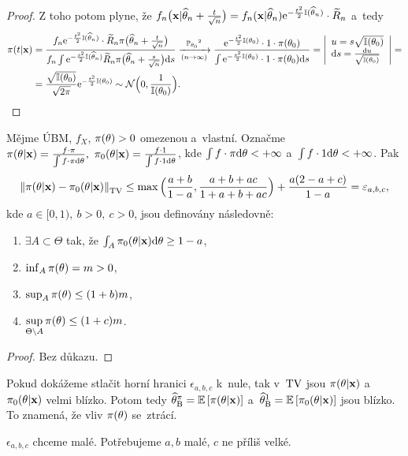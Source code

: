 \begin{dusl}
\begin{proof}
		Z toho potom plyne, že $f_n\big(\textbf{x}|\widehat{\theta}_n+\frac{t}{\sqrt{n}}\big)=f_n(\textbf{x}|\widehat{\theta}_n)\mathrm{e}^{-\frac{t^2}{2}\mathbb{I}(\widehat{\theta}_n)}\cdot\widetilde{R}_n$ a~tedy \[
		\begin{split}
		\pi(t|\textbf{x})&=\frac{f_n\e{-\frac{t^2}{2}\mathbb{I}(\htn)}\cdot\widetilde{R}_n \pi\big( \htn+\frac{t}{\sqrt{n}} \big)}{f_n\int \e{-\frac{s^2}{2}\mathbb{I}(\htn)}\widetilde{R}_n \pi\big(\htn+\frac{s}{\sqrt{n}}\big)\d s}\xrightarrow[(n\rightarrow \infty)]{\PP_{\t_0}\text{\footnotemark}}\frac{\e{-\frac{t^2}{2}\mathbb{I}(\t_0)}\cdot1\cdot \pi(\t_0)}{\int\e{-\frac{s^2}{2}\mathbb{I}(\t_0)}\cdot1\cdot\pi(\t_0)\d s}=\left| \begin{array}{l}
		u=s\sqrt{\mathbb{I}(\t_0)}\\\d s=\frac{\d u}{\sqrt{\mathbb{I}(\t_0)}}		
		\end{array}
		\right|=\\&=\frac{\sqrt{\mathbb{I}(\t_0)}}{\sqrt{2\pi}}\e{-\frac{t^2}{2}\mathbb{I}(\t_0)}\sim\NN\Big( 0,\frac{1}{\mathbb{I}(\t_0)} \Big).
		\end{split}
		\]
	\end{proof}
\end{dusl}
\begin{theorem}
	Mějme ÚBM, $f_X$, $\pi(\theta)>0$ omezenou a~vlastní. Označme $\pi(\theta|\textbf{x})=\frac{f\cdot\pi}{\int f\cdot\pi\mathrm{d}\theta},~\pi_0(\theta|\textbf{x})=\frac{f\cdot1}{\int f\cdot1 \mathrm{d}\theta}$, kde $\int f\cdot\pi\mathrm{d}\theta<+\infty$ a~$\int f\cdot1 \mathrm{d}\theta<+\infty$. Pak
	$$ \left\|\pi(\theta|\textbf{x})-\pi_0(\theta|\textbf{x})\right\|_{\mathrm{TV}}\leq \max\Big(\frac{a+b}{1-a},\frac{a+b+ac}{1+a+b+ac}\Big)+\frac{a(2-a+c)}{1-a}=\varepsilon_{a,b,c},$$
	kde $a\in[ 0,1),~b>0,~c>0$, jsou definovány následovně:\begin{enumerate}[1)]
		\item $\exists A\subset \Theta$ tak, že $\int_A \pi_0(\theta|\textbf{x})\mathrm{d}\theta\geq 1-a$,
		\item $\inf_A \pi(\theta)=m>0$,
		\item $\sup_A \pi(\theta)\leq (1+b)m$,
		\item $\sup\limits_{\Theta\setminus A} \pi(\theta)\leq(1+c)m$. 
	\end{enumerate}
\end{theorem}
\begin{proof}
	Bez důkazu.
\end{proof}
\begin{dusl}
	Pokud dokážeme stlačit horní hranici $\epsilon_{a,b,c}$ k~nule, tak v~$\mathrm{TV}$ jsou $\pi(\theta|\textbf{x})$ a~$\pi_0(\theta|\textbf{x})$ velmi blízko. Potom tedy $\widehat{\theta}_\mathrm{B}^\pi=\mathbb{E}\left[ \pi(\theta|\textbf{x}) \right]$ a~$\widehat{\theta}_\mathrm{B}^1=\mathbb{E}\left[ \pi_0(\theta|\textbf{x}) \right]$ jsou blízko. To znamená, že vliv $\pi(\theta)$ se~ztrácí.
\end{dusl}
\begin{remark}
	$\epsilon_{a,b,c}$ chceme malé. Potřebujeme $a,b$ malé, $c$ ne příliš velké.
\end{remark}


